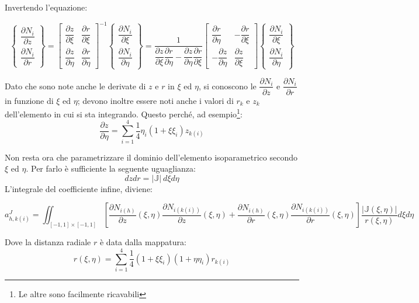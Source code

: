\documentclass{tufte-handout}
\newcommand{\de}[2]{\dfrac{\partial #1}{\partial #2}}
\begin{document}
Invertendo l'equazione:
\begin{fullwidth}
    \[
    \begin{Bmatrix}
        \de{N_i}{z} \\
        \de{N_i}{r}
    \end{Bmatrix}
    =
    \begin{bmatrix}
        \de{z}{\xi} & \de{r}{\xi}\\ \de{z}{\eta} & \de{r}{\eta}
    \end{bmatrix}^{-1}
    \begin{Bmatrix}
        \de{N_i}{\xi} \\ \de{N_i}{\eta}
    \end{Bmatrix}
    =
    \frac{1}{\de{z}{\xi}\de{r}{\eta}-\de{z}{\eta}\de{r}{\xi}}
    \begin{bmatrix}
        \de{r}{\eta}  &-\de{r}{\xi}\\ -\de{z}{\eta} & \de{z}{\xi}
    \end{bmatrix}
    \begin{Bmatrix}
        \de{N_i}{\xi} \\ \de{N_i}{\eta}
    \end{Bmatrix}
\]
\end{fullwidth}

Dato che sono note anche le derivate di $z$ e $r$ in $\xi$ ed $\eta$, si conoscono le $\de{N_i}{z}$ e $\de{N_i}{r}$ in funzione di $\xi$ ed $\eta$; devono inoltre essere noti anche i valori di $r_k$ e $z_k$ dell'elemento in cui si sta integrando.
Questo perché, ad esempio\footnote{Le altre sono facilmente ricavabili}:
\begin{equation*}
    \de{z}{\eta} = \sum_{i=1}^4 \frac{1}{4}\eta_i(1+ \xi \xi_i)z_{k(i)}
\end{equation*}

Non resta ora che parametrizzare il dominio dell'elemento isoparametrico secondo $\xi$ ed $\eta$. Per farlo è sufficiente la seguente uguaglianza:
\begin{equation*}
    dzdr = |\mathbb{J}|\ d\xi d\eta
\end{equation*}
L'integrale del coefficiente infine, diviene:
\begin{fullwidth}
\begin{equation*}
    a_{h,k(i)}^J = 
    \iint_{[-1,1]\times[-1,1]} \left[
          \de{N_{i(h)}}{z}(\xi,\eta) \de{N_{i(k(i))}}{z}(\xi,\eta)
        + \de{N_{i(h)}}{r}(\xi,\eta) \de{N_{i(k(i))}}{r}(\xi,\eta)
    \right] \dfrac{|\mathbb{J}(\xi, \eta)|}{r(\xi,\eta)} d\xi d\eta
\end{equation*}
\end{fullwidth}
Dove la distanza radiale $r$ è data dalla mappatura:
\begin{equation*}
    r(\xi,\eta) = \sum_{i=1}^4 \frac{1}{4} (1+\xi \xi_i)(1+\eta \eta_i) r_{k(i)}
\end{equation*}
\end{document}
